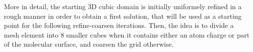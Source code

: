 \documentclass[11pt,a4paper]{article}
\begin{document}
\begin{figure}[H]
    \centering
    \quad
    \caption[]{}
    \label{fig:octree}
\end{figure}

More in detail, the starting 3D cubic domain is initially uniformely refined in a rough manner in order to obtain a first solution, that will be used as a starting point for the following refine-coarsen iterations. Then, the idea is to divide a mesh element into 8 smaller cubes when it contains either an atom charge or part of the molecular surface, and coarsen the grid otherwise. 
\end{document}
